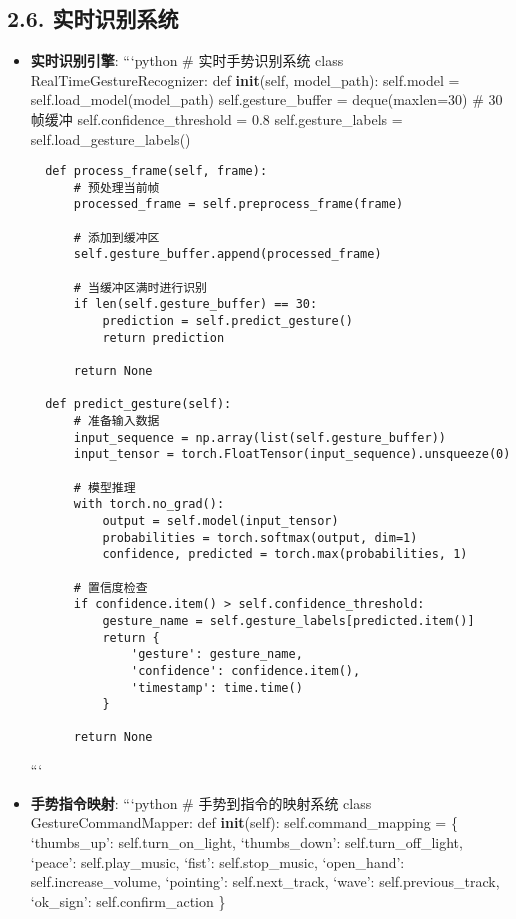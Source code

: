 \subsection{2.6.
实时识别系统}\label{ux5b9eux65f6ux8bc6ux522bux7cfbux7edf}

\begin{itemize}
\item
  \textbf{实时识别引擎}: ```python \# 实时手势识别系统 class
  RealTimeGestureRecognizer: def \textbf{init}(self, model\_path):
  self.model = self.load\_model(model\_path) self.gesture\_buffer =
  deque(maxlen=30) \# 30帧缓冲 self.confidence\_threshold = 0.8
  self.gesture\_labels = self.load\_gesture\_labels()

\begin{lstlisting}
  def process_frame(self, frame):
      # 预处理当前帧
      processed_frame = self.preprocess_frame(frame)

      # 添加到缓冲区
      self.gesture_buffer.append(processed_frame)

      # 当缓冲区满时进行识别
      if len(self.gesture_buffer) == 30:
          prediction = self.predict_gesture()
          return prediction

      return None

  def predict_gesture(self):
      # 准备输入数据
      input_sequence = np.array(list(self.gesture_buffer))
      input_tensor = torch.FloatTensor(input_sequence).unsqueeze(0)

      # 模型推理
      with torch.no_grad():
          output = self.model(input_tensor)
          probabilities = torch.softmax(output, dim=1)
          confidence, predicted = torch.max(probabilities, 1)

      # 置信度检查
      if confidence.item() > self.confidence_threshold:
          gesture_name = self.gesture_labels[predicted.item()]
          return {
              'gesture': gesture_name,
              'confidence': confidence.item(),
              'timestamp': time.time()
          }

      return None
\end{lstlisting}

  ```
\item
  \textbf{手势指令映射}: ```python \# 手势到指令的映射系统 class
  GestureCommandMapper: def \textbf{init}(self): self.command\_mapping =
  \{ `thumbs\_up': self.turn\_on\_light, `thumbs\_down':
  self.turn\_off\_light, `peace': self.play\_music, `fist':
  self.stop\_music, `open\_hand': self.increase\_volume, `pointing':
  self.next\_track, `wave': self.previous\_track, `ok\_sign':
  self.confirm\_action \}


\end{itemize}

